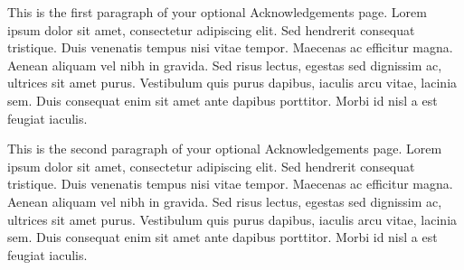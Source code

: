 This is the first paragraph of your optional Acknowledgements page.
Lorem ipsum dolor sit amet, consectetur adipiscing elit. Sed hendrerit
consequat tristique. Duis venenatis tempus nisi vitae tempor. Maecenas
ac efficitur magna. Aenean aliquam vel nibh in gravida. Sed risus
lectus, egestas sed dignissim ac, ultrices sit amet purus. Vestibulum
quis purus dapibus, iaculis arcu vitae, lacinia sem. Duis consequat enim
sit amet ante dapibus porttitor. Morbi id nisl a est feugiat iaculis.

This is the second paragraph of your optional Acknowledgements page.
Lorem ipsum dolor sit amet, consectetur adipiscing elit. Sed hendrerit
consequat tristique. Duis venenatis tempus nisi vitae tempor. Maecenas
ac efficitur magna. Aenean aliquam vel nibh in gravida. Sed risus
lectus, egestas sed dignissim ac, ultrices sit amet purus. Vestibulum
quis purus dapibus, iaculis arcu vitae, lacinia sem. Duis consequat enim
sit amet ante dapibus porttitor. Morbi id nisl a est feugiat iaculis.
